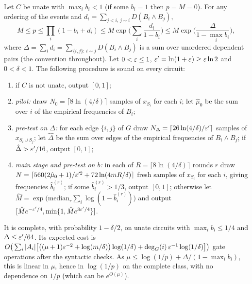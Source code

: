 \begin{theorem}\label{thm:janson-general}
Let $C$ be unate with $\max_ib_i<1$ (if some $b_i=1$ then $p=M=0$). For any ordering
of the events and $d_i=\sum_{j<i,\,j\sim i}D(B_i\wedge B_j)$,
\[
M\le p\le\prod_i(1-b_i+d_i)\le M\exp\Big(\sum_i\frac{d_i}{1-b_i}\Big)\le
M\exp\Big(\frac{\Delta}{1-\max_ib_i}\Big),
\]
where $\Delta=\sum_id_i=\sum_{\{i,j\}:\,i\sim j}D(B_i\wedge B_j)$ is a sum over unordered
dependent pairs (the convention throughout).
Let $0<\varepsilon\le1$, $\varepsilon'=\ln(1+\varepsilon)\ge\varepsilon\ln2$ and $0<\delta<1$. The following
procedure is sound on every circuit:
\begin{enumerate}[label=(\arabic*)]
\item if $C$ is not unate, output $[0,1]$;
\item \emph{pilot:} draw $N_0=\lceil8\ln(4/\delta)\rceil$ samples of $x_{S_i}$ for each
$i$; let $\hat\mu_0$ be the sum over $i$ of the empirical frequencies of $B_i$;
\item \emph{pre-test on $\Delta$:} for each edge $\{i,j\}$ of $G$ draw
$N_\Delta=\lceil26\ln(4/\delta)/\varepsilon'\rceil$ samples of $x_{S_i\cup S_j}$; let $\hat\Delta$
be the sum over edges of the empirical frequencies of $B_i\wedge B_j$; if
$\hat\Delta>\varepsilon'/16$, output $[0,1]$;
\item \emph{main stage and pre-test on $b$:} in each of $R=\lceil8\ln(4/\delta)\rceil$
rounds $r$ draw $N=\lceil560(2\hat\mu_0+1)/\varepsilon'^2+72\ln(4mR/\delta)\rceil$ fresh samples
of $x_{S_i}$ for each $i$, giving frequencies $\hat b_i^{(r)}$; if some
$\hat b_i^{(r)}>1/3$, output $[0,1]$; otherwise let
$\hat M=\exp\big(\mathrm{median}_r\sum_i\log(1-\hat b_i^{(r)})\big)$ and output
$[\hat Me^{-\varepsilon'/4},\min\{1,\hat Me^{3\varepsilon'/4}\}]$.
\end{enumerate}
It is complete, with probability $1-\delta/2$, on unate circuits with
$\max_ib_i\le1/4$ and $\Delta\le\varepsilon'/64$. Its expected cost is
$O\big(\sum_i|A_i|\big[\big((\mu+1)\varepsilon^{-2}+\log(m/\delta)\big)\log(1/\delta)
+\deg_G(i)\,\varepsilon^{-1}\log(1/\delta)\big]\big)$ gate operations after the syntactic
checks. As $\mu\le\log(1/p)+\Delta/(1-\max_ib_i)$, this is linear in $\mu$, hence in
$\log(1/p)$ on the complete class, with no dependence on $1/p$ (which can be
$e^{\Theta(\mu)}$).
\end{theorem}

